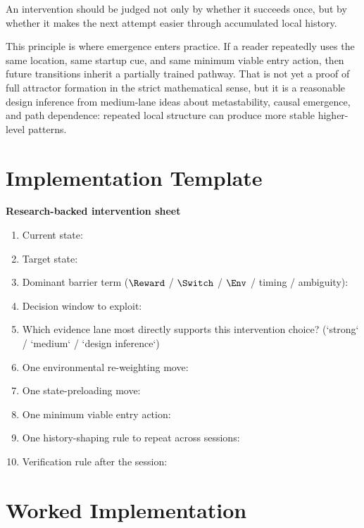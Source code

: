 \begin{proposition}
An intervention should be judged not only by whether it succeeds once, but by
whether it makes the next attempt easier through accumulated local history.
\end{proposition}

\begin{discussion}
This principle is where emergence enters practice. If a reader repeatedly uses
the same location, same startup cue, and same minimum viable entry action, then
future transitions inherit a partially trained pathway. That is not yet a proof
of full attractor formation in the strict mathematical sense, but it is a
reasonable design inference from medium-lane ideas about metastability, causal
emergence, and path dependence: repeated local structure can produce more
stable higher-level patterns.
\end{discussion}

\section{Implementation Template}

\begin{templatebox}
\textbf{Research-backed intervention sheet}
\begin{enumerate}[nosep]
  \item Current state:
  \item Target state:
  \item Dominant barrier term ($\Reward$ / $\Switch$ / $\Env$ / timing / ambiguity):
  \item Decision window to exploit:
  \item Which evidence lane most directly supports this intervention choice?
        (`strong` / `medium` / `design inference`)
  \item One environmental re-weighting move:
  \item One state-preloading move:
  \item One minimum viable entry action:
  \item One history-shaping rule to repeat across sessions:
  \item Verification rule after the session:
\end{enumerate}
\end{templatebox}

\section{Worked Implementation}


